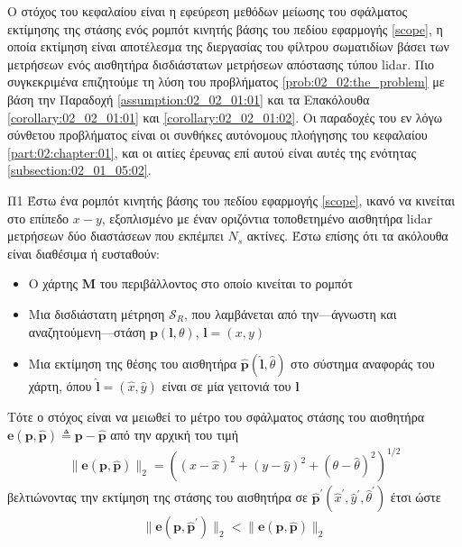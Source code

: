 Ο στόχος του κεφαλαίου είναι η εφεύρεση μεθόδων μείωσης του σφάλματος εκτίμησης
της στάσης ενός ρομπότ κινητής βάσης του πεδίου εφαρμογής \ref{scope}, η οποία
εκτίμηση είναι αποτέλεσμα της διεργασίας του φίλτρου σωματιδίων βάσει των
μετρήσεων ενός αισθητήρα δισδιάστατων μετρήσεων απόστασης τύπου lidar. Πιο
συγκεκριμένα επιζητούμε τη λύση του προβλήματος \ref{prob:02_02:the_problem}
με βάση την Παραδοχή \ref{assumption:02_02_01:01} και τα Επακόλουθα
\ref{corollary:02_02_01:01} και \ref{corollary:02_02_01:02}. Οι παραδοχές
του εν λόγω σύνθετου προβλήματος είναι οι συνθήκες αυτόνομους πλοήγησης
του κεφαλαίου \ref{part:02:chapter:01}, και οι αιτίες έρευνας επί αυτού
είναι αυτές της ενότητας \ref{subsection:02_01_05:02}.

\begin{bw_box}
\begin{customproblem}{Π1}
  \label{prob:02_02:the_problem}
  Έστω ένα ρομπότ κινητής βάσης του πεδίου εφαρμογής \ref{scope}, ικανό να
  κινείται στο επίπεδο $x-y$, εξοπλισμένο με έναν οριζόντια τοποθετημένο
  αισθητήρα lidar μετρήσεων δύο διαστάσεων που εκπέμπει $N_s$ ακτίνες. Έστω
  επίσης ότι τα ακόλουθα είναι διαθέσιμα ή ευσταθούν:
  \begin{itemize}
    \item Ο χάρτης $\bm{M}$ του περιβάλλοντος στο οποίο κινείται το ρομπότ
    \item Μια δισδιάστατη μέτρηση $\mathcal{S}_R$, που λαμβάνεται από
          την---άγνωστη και αναζητούμενη---στάση $\bm{p}(\bm{l},\theta)$,
          $\bm{l} = (x,y)$
    \item Μια εκτίμηση της θέσης του αισθητήρα
          $\hat{\bm{p}}(\hat{\bm{l}}, \hat{\theta})$ στο σύστημα αναφοράς του
          χάρτη, όπου $\hat{\bm{l}} = (\hat{x}, \hat{y})$ είναι σε μία γειτονιά
          του $\bm{l}$
  \end{itemize}
\end{customproblem}
Τότε ο στόχος είναι να μειωθεί το μέτρο του σφάλματος στάσης του αισθητήρα
$\bm{e}(\bm{p}, \hat{\bm{p}}) \triangleq \bm{p}- \hat{\bm{p}}$ από την αρχική
του τιμή
\begin{align}
  \|\bm{e}(\bm{p}, \hat{\bm{p}})\|_2 = ((x- \hat{x})^2 + (y- \hat{y})^2 + (\theta- \hat{\theta})^2)^{1/2}
  \label{eq:pose_error_def}
\end{align}
βελτιώνοντας την εκτίμηση της στάσης του αισθητήρα σε
$\hat{\bm{p}}^\prime(\hat{x}^\prime, \hat{y}^\prime, \hat{\theta}^\prime)$ έτσι ώστε
\begin{align}
  \|\bm{e}(\bm{p}, \hat{\bm{p}}^\prime)\|_2 < \|\bm{e}(\bm{p}, \hat{\bm{p}})\|_2
  \tag{$\ast$}
  \label{obj:the_objective}
\end{align}
\end{bw_box}
